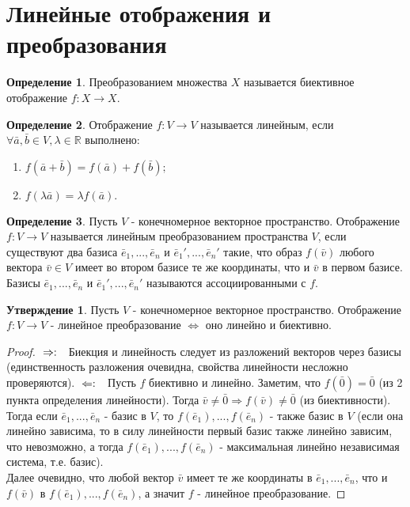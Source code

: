 \documentclass[a4paper, 12pt]{article}
\theoremstyle{definition}
\newtheorem*{definition}{Определение}
\newtheorem*{subtheorem}{Утверждение}
\begin{document}
\section{Линейные отображения и преобразования}
\begin{definition}
	Преобразованием множества $X$ называется биективное отображение $f: X \rightarrow X$.
\end{definition}
\begin{definition}
	Отображение $f: V \rightarrow V$ называется линейным, если $\forall \bar{a}, \bar{b} \in V, \lambda \in \mathbb{R}$ выполнено:
	\begin{enumerate}
		\item $f(\bar{a} + \bar{b}) = f(\bar{a}) + f(\bar{b});$
		\item $f(\lambda \bar{a}) = \lambda f(\bar{a}).$
	\end{enumerate}
\end{definition}
\begin{definition}
	Пусть $V$ - конечномерное векторное пространство. Отображение $f: V \rightarrow V$ называется линейным преобразованием пространства $V$, если существуют два базиса $\bar{e}_{1},...,\bar{e}_{n}$ и $\bar{e}_{1}',...,\bar{e}_{n}'$ такие, что образ $f(\bar{v})$ любого вектора $\bar{v} \in V$ имеет во втором базисе те же координаты, что и $\bar{v}$ в первом базисе. Базисы $\bar{e}_{1},...,\bar{e}_{n}$ и $\bar{e}_{1}',...,\bar{e}_{n}'$ называются ассоциированными с $f$.
\end{definition}
\begin{subtheorem}
	Пусть $V$ - конечномерное векторное пространство. Отображение $f: V \rightarrow V$ - линейное преобразование $\Leftrightarrow$ оно линейно и биективно.
\end{subtheorem}
\begin{proof}
	$\\\Rightarrow: \ \ $ Биекция и линейность следует из разложений векторов через базисы (единственность разложения очевидна, свойства линейности несложно проверяются).
	$\\\Leftarrow: \ \ $ Пусть $f$ биективно и линейно. Заметим, что $f(\bar{0}) = \bar{0}$ (из 2 пункта определения линейности). Тогда $\bar{v} \neq \bar{0} \Rightarrow f(\bar{v}) \neq \bar{0}$ (из биективности). Тогда если $\bar{e}_{1},...,\bar{e}_{n}$ - базис в $V$, то $f(\bar{e}_{1}),...,f(\bar{e}_{n})$ - также базис в $V$ (если она линейно зависима, то в силу линейности первый базис также линейно зависим, что невозможно, а тогда $f(\bar{e}_{1}),...,f(\bar{e}_{n})$ - максимальная линейно независимая система, т.е. базис).\\
	Далее очевидно, что любой вектор $\bar{v}$ имеет те же координаты в $\bar{e}_{1},...,\bar{e}_{n}$, что и $f(\bar{v})$ в $f(\bar{e}_{1}),...,f(\bar{e}_{n})$, а значит $f$ - линейное преобразование.
\end{proof}
\end{document}
